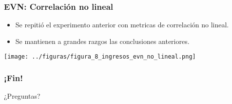 \documentclass[10pt,mathserif]{beamer}%
\begin{document}
\begin{frame}
    \frametitle{EVN: Correlación no lineal}
    \begin{multicols}{2}
        \begin{minipage}{\linewidth}
            \begin{itemize}
                \item Se repitió el experimento anterior con metricas de correlación no lineal.
                \item Se mantienen a grandes razgos las conclusiones anteriores.
            \end{itemize}
        \end{minipage}
        \begin{minipage}{\linewidth}
            \centering
            \texttt{[image: ../figuras/figura\_8\_ingresos\_evn\_no\_lineal.png]} %
        \end{minipage}

    \end{multicols}

\end{frame}

\begin{frame}
\frametitle{¡Fin!}
\begin{center}
{\Huge ¿Preguntas?}

\end{center}
\end{frame}


\end{document}
